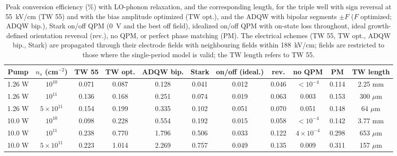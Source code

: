 \documentclass[11pt]{article}
\begin{document}
\begin{table}[t]
\centering\small
\caption{Peak conversion efficiency (\%) with LO-phonon relaxation, and the corresponding length, for the triple well with sign reversal at 55~kV/cm (TW 55) and with the bias amplitude optimized (TW opt.), and the ADQW with bipolar segments $\pm F$ ($F$ optimized; ADQW bip.), Stark on/off QPM (0~V and the best off field), idealized on/off QPM with on-state loss throughout, ideal growth-defined orientation reversal (rev.), no QPM, or perfect phase matching (PM). The electrical schemes (TW 55, TW opt., ADQW bip., Stark) are propagated through their electrode fields with neighbouring fields within 188~kV/cm; fields are restricted to those where the single-period model is valid; the TW length refers to TW 55.}\label{tab:eff}
\setlength{\tabcolsep}{2.4pt}\footnotesize
\begin{tabular}{@{}ccccccccccc@{}}
\toprule
Pump & $n_s$ (cm$^{-2}$) & TW 55 & TW opt. & ADQW bip. & Stark & on/off (ideal.) & rev. & no QPM & PM & TW length \\ \midrule
1.26 W & $10^{10}$ & 0.071 & 0.087 & 0.128 & 0.041 & 0.012 & 0.046 & $<10^{-4}$ & 0.114 & 2.25 mm \\
1.26 W & $10^{11}$ & 0.136 & 0.168 & 0.251 & 0.074 & 0.019 & 0.063 & 0.003 & 0.153 & 300 $\mu$m \\
1.26 W & $5\times10^{11}$ & 0.154 & 0.199 & 0.335 & 0.102 & 0.051 & 0.070 & 0.051 & 0.148 & 64 $\mu$m \\
10.0 W & $10^{10}$ & 0.098 & 0.228 & 0.554 & 0.192 & 0.015 & 0.058 & $<10^{-4}$ & 0.142 & 3.77 mm \\
10.0 W & $10^{11}$ & 0.238 & 0.770 & 1.796 & 0.506 & 0.033 & 0.122 & $4\times10^{-4}$ & 0.298 & 653 $\mu$m \\
10.0 W & $5\times10^{11}$ & 0.223 & 1.014 & 2.269 & 0.757 & 0.049 & 0.135 & 0.009 & 0.311 & 157 $\mu$m \\ \bottomrule
\end{tabular}
\end{table}
\end{document}
